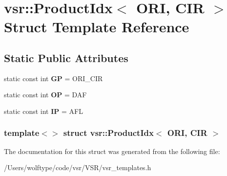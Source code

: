 \hypertarget{structvsr_1_1_product_idx_3_01_o_r_i_00_01_c_i_r_01_4}{\section{vsr\-:\-:Product\-Idx$<$ O\-R\-I, C\-I\-R $>$ Struct Template Reference}
\label{structvsr_1_1_product_idx_3_01_o_r_i_00_01_c_i_r_01_4}
}
\subsection*{Static Public Attributes}
\begin{DoxyCompactItemize}
\item 
\hypertarget{structvsr_1_1_product_idx_3_01_o_r_i_00_01_c_i_r_01_4_a354febcf4b7aa8401bfe43fa13ad4841}{static const int {\bfseries G\-P} = O\-R\-I\-\_\-\-C\-I\-R}\label{structvsr_1_1_product_idx_3_01_o_r_i_00_01_c_i_r_01_4_a354febcf4b7aa8401bfe43fa13ad4841}

\item 
\hypertarget{structvsr_1_1_product_idx_3_01_o_r_i_00_01_c_i_r_01_4_ac5cef3c49853f5d15899b2293848a03c}{static const int {\bfseries O\-P} = D\-A\-F}\label{structvsr_1_1_product_idx_3_01_o_r_i_00_01_c_i_r_01_4_ac5cef3c49853f5d15899b2293848a03c}

\item 
\hypertarget{structvsr_1_1_product_idx_3_01_o_r_i_00_01_c_i_r_01_4_a66da36326570644fceb0516105964c86}{static const int {\bfseries I\-P} = A\-F\-L}\label{structvsr_1_1_product_idx_3_01_o_r_i_00_01_c_i_r_01_4_a66da36326570644fceb0516105964c86}

\end{DoxyCompactItemize}
\subsubsection*{template$<$$>$ struct vsr\-::\-Product\-Idx$<$ O\-R\-I, C\-I\-R $>$}



The documentation for this struct was generated from the following file\-:\begin{DoxyCompactItemize}
\item 
/\-Users/wolftype/code/vsr/\-V\-S\-R/vsr\-\_\-templates.\-h\end{DoxyCompactItemize}
